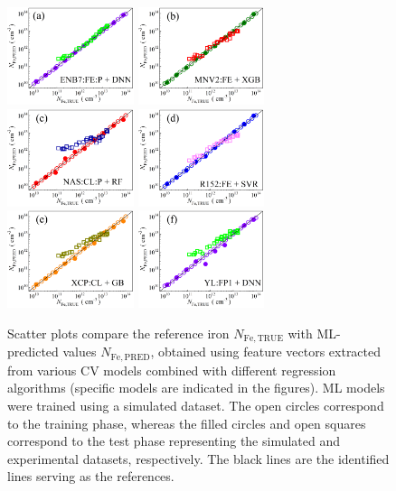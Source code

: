 \documentclass[10pt]{iopart}
\begin{document}
\begin{figure}
\includegraphics[width=0.33\textwidth]{Fig4a}
\includegraphics[width=0.33\textwidth]{Fig4b}
\includegraphics[width=0.33\textwidth]{Fig4c}
\includegraphics[width=0.33\textwidth]{Fig4d}
\includegraphics[width=0.33\textwidth]{Fig4e}
\includegraphics[width=0.33\textwidth]{Fig4f}
\caption{
Scatter plots compare the reference iron $N_\mathrm{Fe,TRUE}$ with ML-predicted values $N_\mathrm{Fe,PRED}$,
obtained using feature vectors extracted from various CV models combined with different regression algorithms
(specific models are indicated in the figures).
ML models were trained using a simulated dataset.
The open circles correspond to the training phase,
whereas the filled circles and open squares correspond to the test phase representing the simulated and experimental datasets, respectively.
The black lines are the identified lines serving as the references.
}\label{Fig4}
\end{figure}
\end{document}
